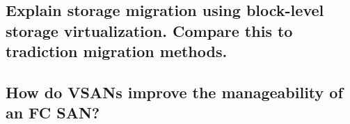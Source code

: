 \subsection{Explain storage migration using block-level storage virtualization. Compare this to tradiction migration methods.} %
\label{sub:explain_storage_migration_using_block_level_storage_virtualization_compare_this_to_tradiction_migration_methods_}


\subsection{How do VSANs improve the manageability of an FC SAN?} %
\label{sub:how_do_vsans_improve_the_manageability_of_an_fc_san}


